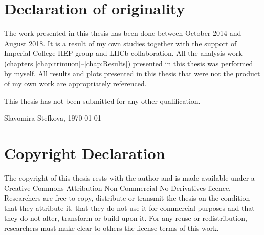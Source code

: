 \chapter*{Declaration of originality}
The work presented in this thesis has been done between October 2014 and August 2018. It is a result of my own studies together with the support of Imperial College HEP group and LHCb collaboration. All the analysis work (chapters \ref{chap:trimuon}--\ref{chap:Results}) presented in this thesis was performed by myself. All results and plots presented in this thesis that were not the product of my own work are appropriately referenced. %

\vspace{1cm}
This thesis has not been submitted for any other qualification.

\vspace{1cm}



Slavomira Stefkova, \vspace{1cm} \today


\vspace{5cm}

\clearpage
{}
{}
\chapter*{Copyright Declaration}
The copyright of this thesis rests with the author and is made available under a Creative Commons Attribution Non-Commercial No Derivatives licence. Researchers are free to copy, distribute or transmit the thesis on the condition that they attribute it, that they do not use it for commercial purposes and that they do not alter, transform or build upon it. For any reuse or redistribution, researchers must make clear to others the license terms of this work.
